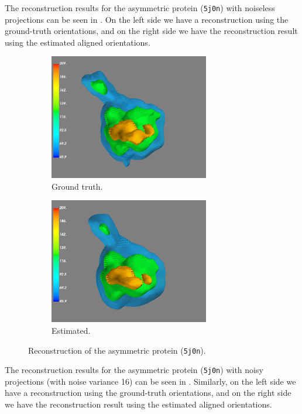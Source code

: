 The reconstruction results for the asymmetric protein (\texttt{5j0n}) with noiseless projections can be seen in . On the left side we have a reconstruction using the ground-truth orientations, and on the right side we have the reconstruction result using the estimated aligned orientations.

\begin{figure}[ht!]
    \centering
    \begin{subfigure}[b]{0.45\textwidth}
        \includegraphics[height=5.5cm]{images/5j0n_reconstruction_GT.png}
        \caption{Ground truth.}
    \end{subfigure}
    \hfill
    \begin{subfigure}[b]{0.5\textwidth}
    \centering
        \includegraphics[height=5.5cm]{images/5j0n_reconstruction_noise0.png}
        \caption{Estimated.}
    \end{subfigure}
    \caption{
        Reconstruction of the asymmetric protein (\texttt{5j0n}).
    }\label{fig:5j0n-reconstruction-noise0}
\end{figure}

The reconstruction results for the asymmetric protein (\texttt{5j0n}) with noisy projections (with noise variance 16) can be seen in . 
Similarly, on the left side we have a reconstruction using the ground-truth orientations, and on the right side we have the reconstruction result using the estimated aligned orientations.

